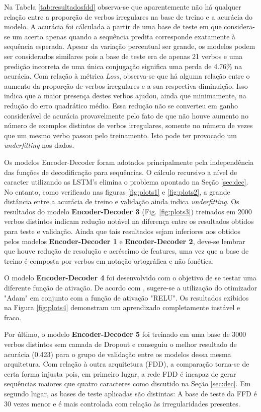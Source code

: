 Na Tabela \ref{tab:resultadosfdd} observa-se que aparentemente não há qualquer relação entre a proporção de verbos irregulares na base de treino e a acurácia do modelo. A acurácia foi cálculada a partir de uma base de teste em que considera-se um acerto apenas quando a sequência predita corresponde exatamente à sequência esperada. Apesar da variação percentual ser grande, os modelos podem ser considerados similares pois a base de teste era de apenas 21 verbos e uma predição incorreta de uma única conjugação significa uma perda de 4.76\% na acurácia. Com relação à métrica \textit{Loss}, observa-se que há alguma relação entre o aumento da proporção de verbos irregulares e a sua respectiva diminuição. Isso indica que a maior presença destes verbos ajudou, ainda que minimamente, na redução do erro quadrático médio. Essa redução não se converteu em ganho considerável de acurácia provavelmente pelo fato de que não houve aumento no número de exemplos distintos de verbos irregulares, somente no número de vezes que um mesmo verbo passou pelo treinamento. Isto pode ter provocado um \textit{underfitting} nos dados.

Os modelos Encoder-Decoder foram adotados principalmente pela independência das funções de decodificação para sequências. O cálculo recursivo a nível de caracter utilizando as LSTM's elimina o problema apontado na Seção \ref{sec:dec}. No entanto, como verificado nas figuras \ref{fig:plots1} e \ref{fig:plots2}, a grande distância entre a acurácia de treino e validação ainda indica \textit{underfitting}. Os resultados do modelo \textbf{Encoder-Decoder 3} (Fig. \ref{fig:plots3}) treinados em 2000 verbos distintos indicam redução notável na diferença entre os resultados obtidos para teste e validação. Ainda que tais resultados sejam inferiores aos obtidos pelos modelos \textbf{Encoder-Decoder 1} e \textbf{Encoder-Decoder 2}, deve-se lembrar que houve redução de resolução e acréscimo de features, uma vez que a base de treino é composta por verbos em notação ortográfica e não fonética. 

O modelo \textbf{Encoder-Decoder 4} foi desenvolvido com o objetivo de se testar uma diferente função de ativação. De acordo com \cite{Goodfellow-et-al-2016}
, sugere-se a utilização do otimizador "Adam" em conjunto com a função de ativação "RELU". Os resultados exibidos na Figura \ref{fig:plots4} demonstram um aprendizado completamente instável e fraco. 

Por último, o modelo \textbf{Encoder-Decoder 5} foi treinado em uma base de 3000 verbos distintos sem camada de Dropout e conseguiu o melhor resultado de acurácia (0.423) para o grupo de validação entre os modelos dessa mesma arquitetura. Com relação à outra arquitetura (FDD), a comparação torna-se de certa forma injusta pois, em primeiro lugar, a rede FDD é incapaz de gerar sequências maiores que quatro caracteres como discutido na Seção \ref{sec:dec}. Em segundo lugar, as bases de teste aplicadas são distintas: A base de teste da FFD é 30 vezes menor e é mais controlada com relação às irregularidades presentes.\\


